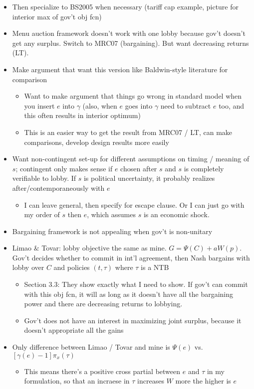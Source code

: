 \documentclass[12pt]{article}
\newcommand{\ga}{\gamma}
\begin{document}
\begin{itemize}
\begin{itemize}
\begin{itemize}
					\end{itemize}
				\item Then specialize to BS2005 when necessary (tariff cap example, picture for interior max of gov't obj fcn)
				\item Menu auction framework doesn't work with one lobby because gov't doesn't get any surplus. Switch to MRC07 (bargaining). But want decreasing returns (LT).
				\item Make argument that want this version like Baldwin-style literature for comparison
					\begin{itemize}
						\item Want to make argument that things go wrong in standard model when you insert $e$ into $\ga$ (also, when $e$ goes into $\ga$ need to subtract $e$ too, and this often results in interior optimum)
						\item This is an easier way to get the result from MRC07 / LT, can make comparisons, develop design results more easily
					\end{itemize}
				\item Want non-contingent set-up for different assumptions on timing / meaning of $s$; contingent only makes sense if $e$ chosen after $s$ and $s$ is completely verifiable to lobby. If $s$ is political uncertainty, it probably realizes after/contemporaneously with $e$
					\begin{itemize}
						\item I can leave general, then specify for escape clause. Or I can just go with my order of $s$ then $e$, which assumes $s$ is an economic shock.
					\end{itemize}
				\item Bargaining framework is not appealing when gov't is non-unitary
				\item Limao $\&$ Tovar: lobby objective the same as mine. $G = \Psi(C) + aW(p)$. Gov't decides whether to commit in int'l agreement, then Nash bargains with lobby over $C$ and policies $(t,\tau)$ where $\tau$ is a NTB
					\begin{itemize}
						\item Section 3.3: They show exactly what I need to show. If gov't can commit with this obj fcn, it will as long as it doesn't have all the bargaining power and there are decreasing returns to lobbying.
						\item Gov't does not have an interest in maximizing joint surplus, because it doesn't appropriate all the gains
					\end{itemize}
				\item Only difference between Limao / Tovar and mine is $\Psi(e)$ vs. $[\ga(e) - 1]\pi_x(\tau)$
					\begin{itemize}
						\item This means there's a positive cross partial between $e$ and $\tau$ in my formulation, so that an incraese in $\tau$ increases $W$ more the higher is $e$
					\end{itemize}
			\end{itemize}
	\end{itemize}
\end{document}
